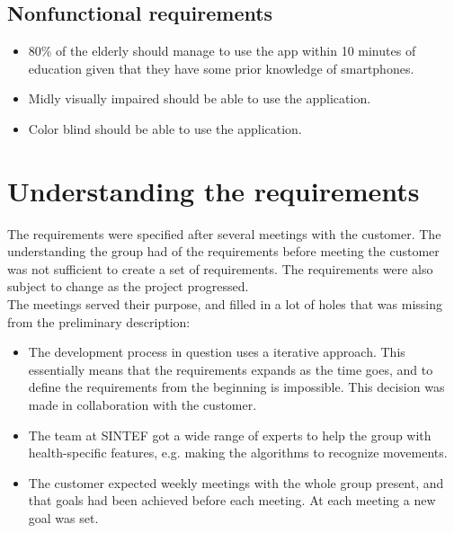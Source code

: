 \subsection{Nonfunctional requirements}
\begin{itemize}
\item 80\% of the elderly should manage to use the app within 10 minutes of education given that they have some prior knowledge of smartphones.
\item Midly visually impaired should be able to use the application.
\item Color blind should be able to use the application.
\end{itemize}	

\section{Understanding the requirements}

The requirements were specified after several meetings with the customer. The understanding the group had of the requirements before meeting the customer was not sufficient to create a set of requirements. The requirements were also subject to change as the project progressed. \\

The meetings served their purpose, and filled in a lot of holes that was missing from the preliminary description:
\begin{itemize}
\item The development process in question uses a iterative approach. This essentially means that the requirements expands as the time goes, and to define the requirements from the beginning is impossible. This decision was made in collaboration with the customer.
\item The team at SINTEF got a wide range of experts to help the group with health-specific features, e.g. making the algorithms to recognize movements.
\item The customer expected weekly meetings with the whole group present, and that goals had been achieved before each meeting. At each meeting a new goal was set.
\end{itemize}

